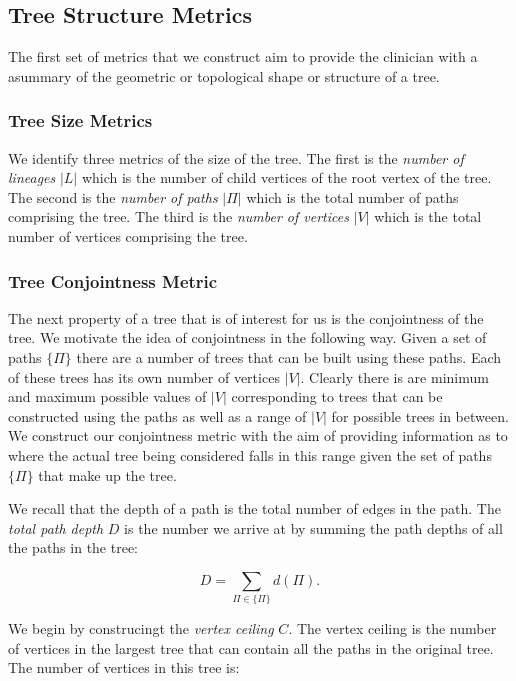 \documentclass{article}
\begin{document}
\subsection{Tree Structure Metrics}

The first set of metrics that we construct aim to provide the clinician with a asummary of the geometric or topological shape or structure of a tree.

\subsubsection{Tree Size Metrics}

We identify three metrics of the size of the tree. The first is the \textit{number of lineages} $|L|$ which is the number of child vertices of the root vertex of the tree. The second is the \textit{number of paths} $|\Pi|$ which is the total number of paths comprising the tree. The third is the \textit{number of vertices} $|V|$ which is the total number of vertices comprising the tree. 

\subsubsection{Tree Conjointness Metric}

The next property of a tree that is of interest for us is the conjointness of the tree. We motivate the idea of conjointness in the following way. Given a set of paths $\{\Pi\}$ there are a number of trees that can be built using these paths. Each of these trees has its own number of vertices $|V|$. Clearly there is are minimum and maximum possible values of $|V|$ corresponding to trees that can be constructed using the paths as well as a range of $|V|$ for possible trees in between. We construct our conjointness metric with the aim of providing information as to where the actual tree being considered falls in this range given the set of paths $\{\Pi\}$ that make up the tree.

We recall that the depth of a path is the total number of edges in the path. The \textit{total path depth} $D$ is the number we arrive at by summing the path depths of all the paths in the tree:

\begin{equation}
D = \sum_{\Pi \in \{\Pi\}} d(\Pi).
\end{equation}

We begin by construcingt the \textit{vertex ceiling} $C$. The vertex ceiling is the number of vertices in the largest tree that can contain all the paths in the original tree. The number of vertices in this tree is:
\end{document}
